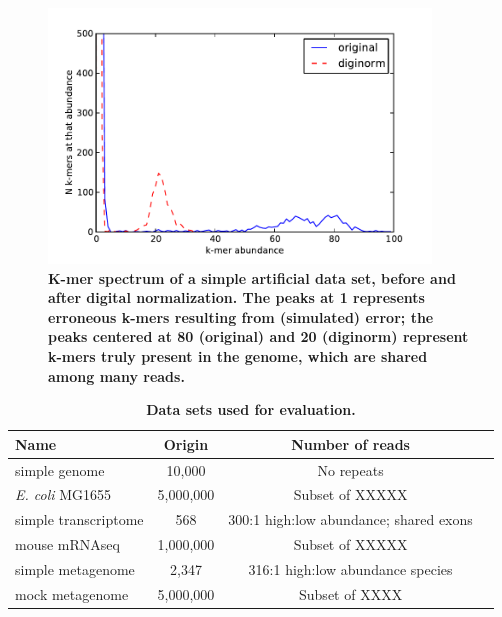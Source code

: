 \documentclass{article}
\begin{document}
\begin{figure}[!ht]
 \centerline{\includegraphics[width=4in]{./figures/kmer-spectrum}}
\caption{\bf K-mer spectrum of a simple artificial data set, before
  and after digital normalization.  The peaks at 1 represents
  erroneous k-mers resulting from (simulated) error; the peaks
  centered at 80 (original) and 20 (diginorm) represent k-mers truly
  present in the genome, which are shared among many reads.}
\label{fig:spectrum}
\end{figure}



\begin{table}
\begin{tabular}{|l|c|c|l|}
\hline
Name & Origin & Number of reads \\
\hline
simple genome & 10,000 & No repeats \\
{\em E. coli} MG1655 & 5,000,000 & Subset of XXXXX \\
simple transcriptome & 568 & 300:1 high:low abundance; shared exons\\
mouse mRNAseq & 1,000,000 & Subset of XXXXX \\
simple metagenome & 2,347 & 316:1 high:low abundance species  \\
mock metagenome & 5,000,000 & Subset of XXXX \\
\hline
\end{tabular}

\caption{{\bf Data sets used for evaluation.}}
\label{tab:data}
\end{table}
\end{document}
